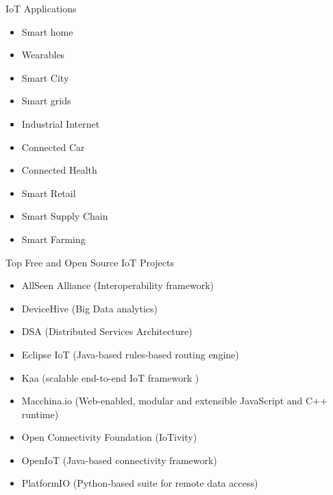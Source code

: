 \begin{frame}{IoT Applications}

\begin{itemize}
    \item Smart home
\item Wearables
\item Smart City
\item Smart grids
\item Industrial Internet
\item Connected Car
\item Connected Health
\item Smart Retail
\item Smart Supply Chain
\item Smart Farming
\end{itemize}

\end{frame}

\begin{frame}{Top Free and Open Source IoT Projects}
    \begin{itemize}
        \item AllSeen Alliance (Interoperability framework) 
        \item DeviceHive (Big Data analytics)
        \item DSA (Distributed Services Architecture)
        \item Eclipse IoT (Java-based rules-based routing engine)
        \item Kaa (scalable end-to-end IoT framework )
        \item Macchina.io (Web-enabled, modular and extensible JavaScript and C++ runtime)
        \item Open Connectivity Foundation (IoTivity)
        \item OpenIoT (Java-based connectivity framework)
        \item PlatformIO (Python-based suite for remote data access)
    \end{itemize}
    
\end{frame}

